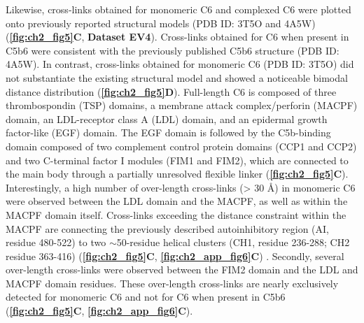 Likewise, cross-links obtained for monomeric C6 and complexed C6 were plotted onto previously reported structural models (PDB ID: 3T5O and 4A5W) (\textbf{\autoref{fig:ch2_fig5}C}, \textbf{Dataset EV4}). Cross-links obtained for C6 when present in C5b6 were consistent with the previously published C5b6 structure (PDB ID: 4A5W). In contrast, cross-links obtained for monomeric C6 (PDB ID: 3T5O) did not substantiate the existing structural model and showed a noticeable bimodal distance distribution (\textbf{\autoref{fig:ch2_fig5}D}). Full-length C6 is composed of three thrombospondin (TSP) domains, a membrane attack complex/perforin (MACPF) domain, an LDL-receptor class A (LDL) domain, and an epidermal growth factor-like (EGF) domain. The EGF domain is followed by the C5b-binding domain composed of two complement control protein domains (CCP1 and CCP2) and two C-terminal factor I modules (FIM1 and FIM2), which are connected to the main body through a partially unresolved flexible linker (\textbf{\autoref{fig:ch2_fig5}C}). Interestingly, a high number of over-length cross-links (> 30 Å) in monomeric C6 were observed between the LDL domain and the MACPF, as well as within the MACPF domain itself. Cross-links exceeding the distance constraint within the MACPF are connecting the previously described autoinhibitory region (AI, residue 480-522) to two $\sim$50-residue helical clusters (CH1, residue 236-288; CH2 residue 363-416) (\textbf{\autoref{fig:ch2_fig5}C}, \textbf{\autoref{fig:ch2_app_fig6}C}) \cite{Hadders_2012}. Secondly, several over-length cross-links were observed between the FIM2 domain and the LDL and MACPF domain residues. These over-length cross-links are nearly exclusively detected for monomeric C6 and not for C6 when present in C5b6 (\textbf{\autoref{fig:ch2_fig5}C}, \textbf{\autoref{fig:ch2_app_fig6}C}).
%
